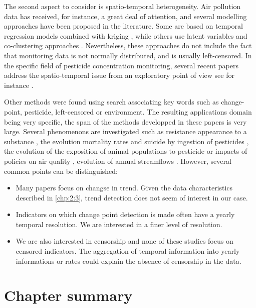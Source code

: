The second aspect to consider is spatio-temporal heterogeneity. Air pollution data has received, for instance, a great deal of attention, and several modelling approaches have been proposed in the literature. Some are based on temporal regression models combined with kriging \citep{sampson2011,lindstrom2014flexible}, while others use latent variables and co-clustering approaches \citep{bouveyron2021co}. Nevertheless, these approaches do not include the fact that monitoring data is not normally distributed, and is usually left-censored. In the specific field of pesticide concentration monitoring, several recent papers address the spatio-temporal issue from an exploratory point of view see for instance \cite{masia2016,figueiredo2021spatio,aznar2017spatio}. 

Other methods were found using search associating key words such as change-point, pesticide, left-censored or environment. The resulting applications domain being very specific, the span of the methods developped in these papers is very large. Several phenomenons are investigated such as resistance appearance to a substance \citep{Solla2010}, the evolution mortality rates and suicide by ingestion of pesticides \citep{Ko2017}, the evolution of the exposition of animal populations to pesticide \citep{Menger2022} or impacts of policies on air quality \citep{FOMBY2006}, evolution of annual streamflows \citep{Ryberg2020}. However, several common points can be distinguished:      
\begin{itemize}
\item Many papers focus on changse in trend. Given the data characteristics described in \ref{chp:2:3}, trend detection does not seem of interest in our case.
\item Indicators on which change point detection is made often have a yearly temporal resolution. We are interested in a finer level of resolution. 
\item We are also interested in censorship and none of these studies focus on censored indicators. The aggregation of temporal information into yearly informations or rates could explain the absence of censorship in the data.   
\end{itemize}

\clearpage

\section{Chapter summary}

